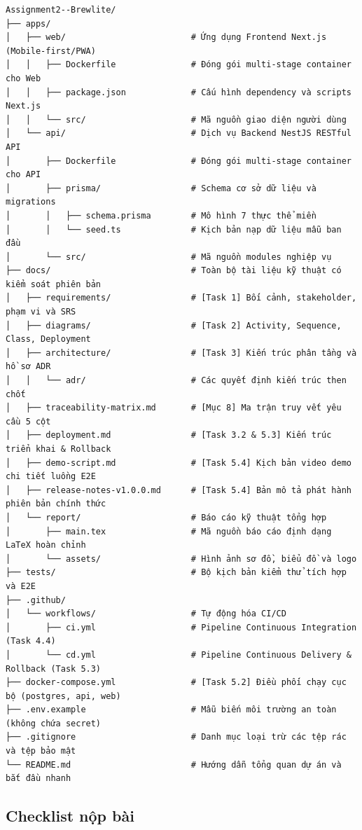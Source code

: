 \documentclass[a4paper]{article}
\begin{document}
\begin{verbatim}
Assignment2--Brewlite/
├── apps/
│   ├── web/                         # Ứng dụng Frontend Next.js (Mobile-first/PWA)
│   │   ├── Dockerfile               # Đóng gói multi-stage container cho Web
│   │   ├── package.json             # Cấu hình dependency và scripts Next.js
│   │   └── src/                     # Mã nguồn giao diện người dùng
│   └── api/                         # Dịch vụ Backend NestJS RESTful API
│       ├── Dockerfile               # Đóng gói multi-stage container cho API
│       ├── prisma/                  # Schema cơ sở dữ liệu và migrations
│       │   ├── schema.prisma        # Mô hình 7 thực thể miền
│       │   └── seed.ts              # Kịch bản nạp dữ liệu mẫu ban đầu
│       └── src/                     # Mã nguồn modules nghiệp vụ
├── docs/                            # Toàn bộ tài liệu kỹ thuật có kiểm soát phiên bản
│   ├── requirements/                # [Task 1] Bối cảnh, stakeholder, phạm vi và SRS
│   ├── diagrams/                    # [Task 2] Activity, Sequence, Class, Deployment
│   ├── architecture/                # [Task 3] Kiến trúc phân tầng và hồ sơ ADR
│   │   └── adr/                     # Các quyết định kiến trúc then chốt
│   ├── traceability-matrix.md       # [Mục 8] Ma trận truy vết yêu cầu 5 cột
│   ├── deployment.md                # [Task 3.2 & 5.3] Kiến trúc triển khai & Rollback
│   ├── demo-script.md               # [Task 5.4] Kịch bản video demo chi tiết luồng E2E
│   ├── release-notes-v1.0.0.md      # [Task 5.4] Bản mô tả phát hành phiên bản chính thức
│   └── report/                      # Báo cáo kỹ thuật tổng hợp
│       ├── main.tex                 # Mã nguồn báo cáo định dạng LaTeX hoàn chỉnh
│       └── assets/                  # Hình ảnh sơ đồ, biểu đồ và logo
├── tests/                           # Bộ kịch bản kiểm thử tích hợp và E2E
├── .github/
│   └── workflows/                   # Tự động hóa CI/CD
│       ├── ci.yml                   # Pipeline Continuous Integration (Task 4.4)
│       └── cd.yml                   # Pipeline Continuous Delivery & Rollback (Task 5.3)
├── docker-compose.yml               # [Task 5.2] Điều phối chạy cục bộ (postgres, api, web)
├── .env.example                     # Mẫu biến môi trường an toàn (không chứa secret)
├── .gitignore                       # Danh mục loại trừ các tệp rác và tệp bảo mật
└── README.md                        # Hướng dẫn tổng quan dự án và bắt đầu nhanh
\end{verbatim}

\subsection{Checklist nộp bài}
\end{document}
